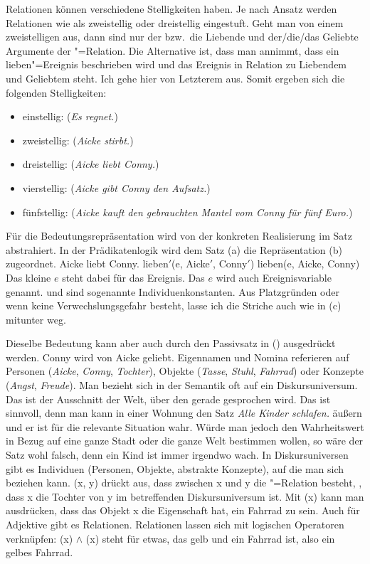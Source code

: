Relationen können verschiedene Stelligkeiten haben. Je nach Ansatz werden Relationen wie
 als zweistellig oder dreistellig eingestuft. Geht man von einem zweistelligen
 aus, dann sind nur der bzw.\ die Liebende und der/die/das Geliebte Argumente der
"=Relation. Die Alternative ist, dass man annimmt, dass ein lieben"=Ereignis
beschrieben wird und das Ereignis in Relation zu Liebendem und Geliebtem steht. Ich gehe hier von
Letzterem aus. Somit ergeben sich die folgenden Stelligkeiten:
\begin{itemize}
\item einstellig:     (\emph{Es regnet.}) 
\item zweistellig:   (\emph{Aicke stirbt.})
\item dreistellig:    (\emph{Aicke liebt Conny.})
\item vierstellig:     (\emph{Aicke gibt Conny den Aufsatz.})
\item fünfstellig:    (\emph{Aicke kauft den gebrauchten Mantel vom Conny für fünf Euro.})
\end{itemize}
Für die Bedeutungsrepräsentation wird von der konkreten Realisierung im Satz abstrahiert. 
In der Prädikatenlogik wird \zb dem Satz (a) die Repräsentation (b) zugeordnet.
\eal
\ex Aicke liebt Conny.
\ex lieben$'$(e, Aicke$'$, Conny$'$)
\ex lieben(e, Aicke, Conny)
\zl
Das kleine $e$ steht dabei für das Ereignis. Das $e$ wird auch Ereignisvariable
genannt.  und  sind sogenannte Individuenkonstanten. Aus
Platzgründen oder wenn keine Verwechslungsgefahr besteht, lasse ich die Striche auch wie in (c) mitunter weg. 

Dieselbe Bedeutung kann aber auch durch den Passivsatz in () ausgedrückt werden.
\ea
Conny wird von Aicke geliebt.
\z
Eigennamen und Nomina referieren auf Personen (\emph{Aicke}, \emph{Conny}, \emph{Tochter}), Objekte (\emph{Tasse},
\emph{Stuhl}, \emph{Fahrrad}) oder Konzepte (\emph{Angst}, \emph{Freude}). Man bezieht sich in der
Semantik oft auf ein Diskursuniversum. Das ist der Ausschnitt der Welt, über den gerade
gesprochen wird. Das ist sinnvoll, denn man kann in einer Wohnung den Satz \emph{Alle Kinder
  schlafen.} äußern und er ist für die relevante Situation wahr. Würde man jedoch den Wahrheitswert
in Bezug auf eine ganze Stadt oder die ganze Welt bestimmen wollen, so wäre der Satz wohl falsch,
denn ein Kind ist immer irgendwo wach.
In Diskursuniversen gibt es Individuen (Personen, Objekte, abstrakte Konzepte), auf
die man sich beziehen kann. (x, y) drückt aus, dass zwischen x und y die
"=Relation besteht, \dash, dass x die Tochter von y im betreffenden
Diskursuniversum ist. Mit (x) kann man ausdrücken, dass das Objekt x die
Eigenschaft hat, ein Fahrrad zu sein. Auch für Adjektive gibt es Relationen. Relationen lassen sich
mit logischen Operatoren verknüpfen: (x) $\wedge$ (x) steht für
etwas, das gelb und ein Fahrrad ist, also ein gelbes Fahrrad.

